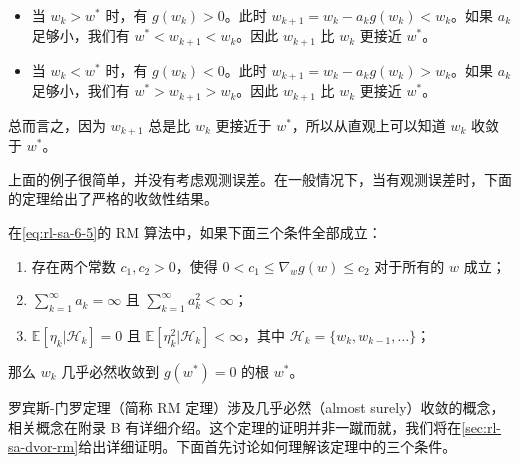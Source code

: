 \begin{itemize}
  \item 当 $w_k > w^*$ 时，有 $g(w_k) > 0$。此时 $w_{k+1} = w_k - a_k g(w_k) < w_k$。如果 $a_k$ 足够小，我们有 $w^* < w_{k+1} < w_k$。因此 $w_{k+1}$ 比 $w_k$ 更接近 $w^*$。
  \item 当 $w_k < w^*$ 时，有 $g(w_k) < 0$。此时 $w_{k+1} = w_k - a_k g(w_k) > w_k$。如果 $a_k$ 足够小，我们有 $w^* > w_{k+1} > w_k$。因此 $w_{k+1}$ 比 $w_k$ 更接近 $w^*$。
\end{itemize}

总而言之，因为 $w_{k+1}$ 总是比 $w_k$ 更接近于 $w^*$，所以从直观上可以知道 $w_k$ 收敛于 $w^*$。

上面的例子很简单，并没有考虑观测误差。在一般情况下，当有观测误差时，下面的定理给出了严格的收敛性结果。

\begin{theorem}\label{thm:rl-sa-rm}
在\eqref{eq:rl-sa-6-5}的 RM 算法中，如果下面三个条件全部成立：
\begin{enumerate}
  \item[(a)] 存在两个常数 $c_1, c_2 > 0$，使得 $0 < c_1 \leqslant \nabla_w g(w) \leqslant c_2$ 对于所有的 $w$ 成立；
  \item[(b)] $\sum_{k=1}^{\infty} a_k = \infty$ 且 $\sum_{k=1}^{\infty} a_k^2 < \infty$；
  \item[(c)] $\mathbb{E}[\eta_k | \mathcal{H}_k] = 0$ 且 $\mathbb{E}[\eta_k^2 | \mathcal{H}_k] < \infty$，其中 $\mathcal{H}_k = \{w_k, w_{k-1}, \ldots\}$；
\end{enumerate}
那么 $w_k$ 几乎必然收敛到 $g(w^*) = 0$ 的根 $w^*$。
\end{theorem}

罗宾斯-门罗定理（简称 RM 定理）涉及几乎必然（almost surely）收敛的概念，相关概念在附录 B 有详细介绍。这个定理的证明并非一蹴而就，我们将在\cref{sec:rl-sa-dvor-rm}给出详细证明。下面首先讨论如何理解该定理中的三个条件。

